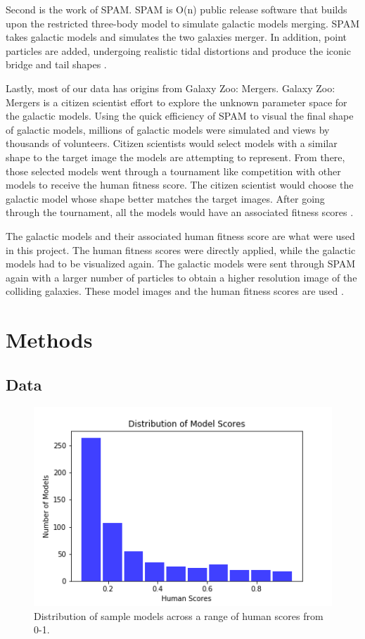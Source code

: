 \documentclass[conference]{IEEEtran}
\begin{document}
Second is the work of SPAM. SPAM is O(n) public release
software that builds upon the restricted three-body model to
simulate galactic models merging. SPAM takes galactic
models and simulates the two galaxies merger. In addition,
point particles are added, undergoing realistic tidal distortions
and produce the iconic bridge and tail shapes \cite{WallinJSPAM}.

Lastly, most of our data has origins from Galaxy Zoo:
Mergers. Galaxy Zoo: Mergers is a citizen scientist effort to
explore the unknown parameter space for the galactic models.
Using the quick efficiency of SPAM to visual the final shape of
galactic models, millions of galactic models were simulated
and views by thousands of volunteers. Citizen scientists would
select models with a similar shape to the target image the
models are attempting to represent. From there, those
selected models went through a tournament like competition
with other models to receive the human fitness score. The
citizen scientist would choose the galactic model whose shape
better matches the target images. After going through the
tournament, all the models would have an associated fitness
scores \cite{WallinGalaxyZoo}.

The galactic models and their associated human fitness
score are what were used in this project. The human fitness
scores were directly applied, while the galactic models had to
be visualized again. The galactic models were sent through
SPAM again with a larger number of particles to obtain a 
higher resolution image of the colliding galaxies. These model
images and the human fitness scores are used \cite{WallinJSPAM}\cite{WallinGalaxyZoo}.


\section{Methods}

\subsection{Data}

\begin{figure}[htbp]
\centerline{\includegraphics[width=0.75\linewidth]{./Images/distribution.png}}
\caption{Distribution of sample models across a range of human scores from 0-1.}
\label{fig:distribution}
\end{figure}
\end{document}
